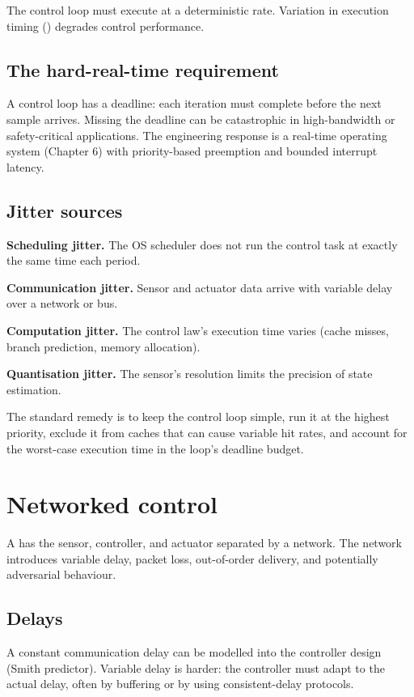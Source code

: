 The control loop must execute at a deterministic rate. Variation in execution timing () degrades control performance.

\subsection{The hard-real-time requirement}

A control loop has a deadline: each iteration must complete before the next sample arrives. Missing the deadline can be catastrophic in high-bandwidth or safety-critical applications. The engineering response is a real-time operating system (Chapter 6) with priority-based preemption and bounded interrupt latency.

\subsection{Jitter sources}

\textbf{Scheduling jitter.} The OS scheduler does not run the control task at exactly the same time each period.

\textbf{Communication jitter.} Sensor and actuator data arrive with variable delay over a network or bus.

\textbf{Computation jitter.} The control law's execution time varies (cache misses, branch prediction, memory allocation).

\textbf{Quantisation jitter.} The sensor's resolution limits the precision of state estimation.

The standard remedy is to keep the control loop simple, run it at the highest priority, exclude it from caches that can cause variable hit rates, and account for the worst-case execution time in the loop's deadline budget.

\section{Networked control}

A  has the sensor, controller, and actuator separated by a network. The network introduces variable delay, packet loss, out-of-order delivery, and potentially adversarial behaviour.

\subsection{Delays}

A constant communication delay can be modelled into the controller design (Smith predictor). Variable delay is harder: the controller must adapt to the actual delay, often by buffering or by using consistent-delay protocols.

